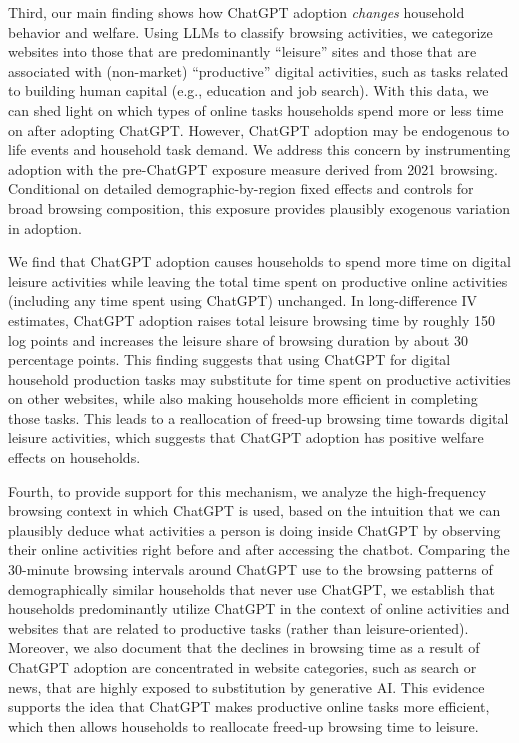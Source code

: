 \documentclass[12pt]{article}
\begin{document}
 
Third, our main finding shows how ChatGPT adoption \textit{changes} household behavior and welfare. Using LLMs to classify browsing activities, we categorize websites into those that are predominantly ``leisure'' sites and those that are associated with (non-market) ``productive'' digital activities, such as tasks related to building human capital (e.g., education and job search).  With this data, we can shed light on which types of online tasks households spend more or less time on after adopting ChatGPT. However, ChatGPT adoption may be endogenous to life events and household task demand. We address this concern by instrumenting adoption with the pre-ChatGPT exposure measure derived from 2021 browsing. Conditional on detailed demographic-by-region fixed effects and controls for broad browsing composition, this exposure provides plausibly exogenous variation in adoption.

We find that ChatGPT adoption causes households to spend more time on digital leisure activities while leaving the total time spent on productive online activities (including any time spent using ChatGPT) unchanged. In long-difference IV estimates, ChatGPT adoption raises total leisure browsing time by roughly 150 log points and increases the leisure share of browsing duration by about 30 percentage points. This finding suggests that using ChatGPT for digital household production tasks may substitute for time spent on productive activities on other websites, while also making households more efficient in completing those tasks. This leads to a reallocation of freed-up browsing time towards digital leisure activities, which suggests that ChatGPT adoption has positive welfare effects on households.

Fourth, to provide support for this mechanism, we analyze the high-frequency browsing context in which ChatGPT is used, based on the intuition that we can plausibly deduce what activities a person is doing inside ChatGPT by observing their online activities right before and after accessing the chatbot. Comparing the 30-minute browsing intervals around ChatGPT use to the browsing patterns of demographically similar households that never use ChatGPT, we establish that households predominantly utilize ChatGPT in the context of online activities and websites that are related to productive tasks (rather than leisure-oriented).  Moreover, we also document that the declines in  browsing time as a result of ChatGPT adoption are concentrated in website categories, such as search or news, that are highly exposed to substitution by generative AI. This evidence supports the idea that ChatGPT makes productive online tasks more efficient, which then allows households to reallocate freed-up browsing time to leisure. 
\end{document}

